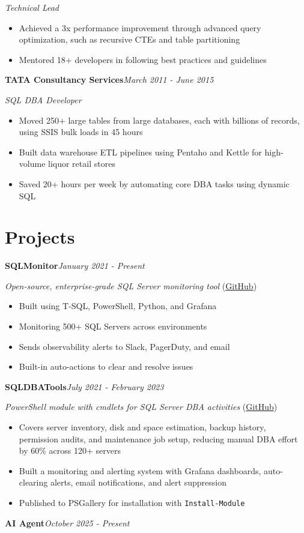 \documentclass[10pt,a4paper]{article}
\begin{document}
\textit{Technical Lead}\\[-5pt]
\begin{itemize}
  \item Achieved a 3x performance improvement through advanced query optimization, such as recursive CTEs and table partitioning
  \item Mentored 18+ developers in following best practices and guidelines
\end{itemize}
\vspace{14.7pt}
\noindent\textbf{TATA Consultancy Services}\hfill \textit{March 2011 - June 2015}

\textit{SQL DBA Developer}\\[-5pt]
\begin{itemize}
  \item Moved 250+ large tables from large databases, each with billions of records, using SSIS bulk loads in 45 hours
  \item Built data warehouse ETL pipelines using Pentaho and Kettle for high-volume liquor retail stores
  \item Saved 20+ hours per week by automating core DBA tasks using dynamic SQL
\end{itemize}

\section{Projects}

\noindent\textbf{SQLMonitor}\hfill \textit{January 2021 - Present}

\textit{Open-source, enterprise-grade SQL Server monitoring tool} (\href{https://github.com/imajaydwivedi/SQLMonitor}{GitHub})
\begin{itemize}
  \item Built using T-SQL, PowerShell, Python, and Grafana
  \item Monitoring 500+ SQL Servers across environments
  \item Sends observability alerts to Slack, PagerDuty, and email
  \item Built-in auto-actions to clear and resolve issues
\end{itemize}
\vspace{14.7pt}
\noindent\textbf{SQLDBATools}\hfill \textit{July 2021 - February 2023}

\textit{PowerShell module with cmdlets for SQL Server DBA activities} (\href{https://github.com/imajaydwivedi/SQLDBATools}{GitHub})
\begin{itemize}
  \item Covers server inventory, disk and space estimation, backup history, permission audits, and maintenance job setup, reducing manual DBA effort by 60\% across 120+ servers
  \item Built a monitoring and alerting system with Grafana dashboards, auto-clearing alerts, email notifications, and alert suppression
  \item Published to PSGallery for installation with \texttt{Install-Module}
\end{itemize}
\vspace{14.7pt}
\noindent\textbf{AI Agent}\hfill \textit{October 2025 - Present}
\end{document}
